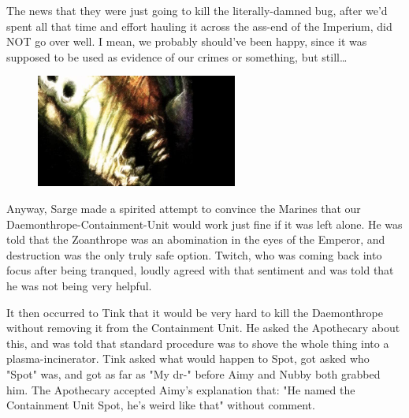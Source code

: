 





The news that they were just going to kill the literally-damned bug, after we'd spent all that time and effort hauling it across the ass-end of the Imperium, did NOT go over well. 
I mean, we probably should've been happy, since it was supposed to be used as evidence of our crimes or something, but still…
\begin{figure}
	\begin{center}
		\includegraphics[width=\figwidth]{pics/16/15.png}
	\end{center}
\end{figure}
Anyway, Sarge made a spirited attempt to convince the Marines that our Daemonthrope-Containment-Unit would work just fine if it was left alone. 
He was told that the Zoanthrope was an abomination in the eyes of the Emperor, and destruction was the only truly safe option. 
Twitch, who was coming back into focus after being tranqued, loudly agreed with that sentiment and was told that he was not being very helpful. 


It then occurred to Tink that it would be very hard to kill the Daemonthrope without removing it from the Containment Unit. 
He asked the Apothecary about this, and was told that standard procedure was to shove the whole thing into a plasma-incinerator. 
Tink asked what would happen to Spot, got asked who "Spot" was, and got as far as "My dr-" before Aimy and Nubby both grabbed him. 
The Apothecary accepted Aimy's explanation that: 
"He named the Containment Unit Spot, he's weird like that" without comment.

